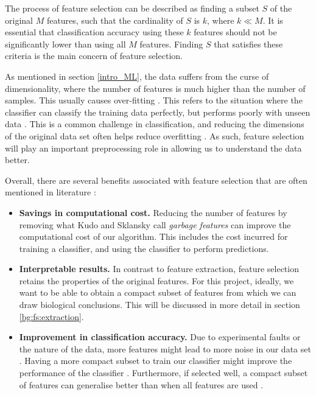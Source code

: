 \documentclass[12pt, twoside, a4paper]{report}
\begin{document}
The process of feature selection can be described as finding a subset $S$ of the original $M$ features, such that the cardinality of $S$ is $k$, where $k \ll M$. It is essential that classification accuracy using these $k$ features should not be significantly lower than using all $M$ features. Finding $S$ that satisfies these criteria is the main concern of feature selection.

As mentioned in section \ref{intro_ML}, the data suffers from the curse of dimensionality, where the number of features is much higher than the number of samples. This usually causes over-fitting \cite{RefWorks:115, RefWorks:175}. This refers to the situation where the classifier can classify the training data perfectly, but performs poorly with unseen data \cite{RefWorks:98}. This is a common challenge in classification, and reducing the dimensions of the original data set often helps reduce overfitting \cite{RefWorks:228}. As such, feature selection will play an important preprocessing role in allowing us to understand the data better.

Overall, there are several benefits associated with feature selection that are often mentioned in literature \cite{RefWorks:140}:
\begin{itemize}
  \item \textbf{Savings in computational cost.} Reducing the number of features by removing what Kudo and Sklansky call \textit{garbage features} \cite{RefWorks:210} can improve the computational cost of our algorithm. This includes the cost incurred for training a classifier, and using the classifier to perform predictions.
  \item \textbf{Interpretable results.} In contrast to feature extraction, feature selection retains the properties of the original features. For this project, ideally, we want to be able to obtain a compact subset of features from which we can draw biological conclusions. This will be discussed in more detail in section \ref{bg:fs:extraction}.
  \item \textbf{Improvement in classification accuracy.} Due to experimental faults or the nature of the data, more features might lead to more noise in our data set \cite{RefWorks:163, RefWorks:197}. Having a more compact subset to train our classifier might improve the performance of the classifier \cite{RefWorks:174}. Furthermore, if selected well, a compact subset of features can generalise better than when all features are used \cite{RefWorks:233}.
\end{itemize}
\end{document}
